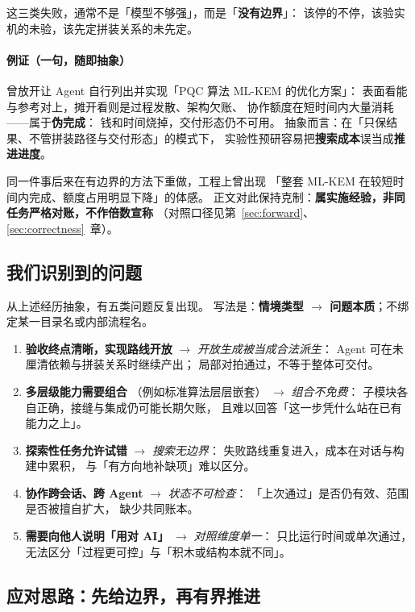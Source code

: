 \documentclass[UTF8,a4paper,11pt]{ctexart}
\theoremstyle{definition}
\theoremstyle{plain}
\theoremstyle{remark}
\numberwithin{figure}{section}
\numberwithin{table}{section}
\begin{document}
这三类失败，通常不是「模型不够强」，而是「\textbf{没有边界}」：
该停的不停，该验实机的未验，该先定拼装关系的未先定。

\paragraph{例证（一句，随即抽象）}
曾放开让 Agent 自行列出并实现「PQC 算法 ML-KEM 的优化方案」：
表面看能与参考对上，摊开看则是过程发散、架构欠账、
协作额度在短时间内大量消耗——属于\textbf{伪完成}：
钱和时间烧掉，交付形态仍不可用。
抽象而言：在「只保结果、不管拼装路径与交付形态」的模式下，
实验性预研容易把\textbf{搜索成本}误当成\textbf{推进进度}。

同一件事后来在有边界的方法下重做，工程上曾出现
「整套 ML-KEM 在较短时间内完成、额度占用明显下降」的体感。
正文对此保持克制：\textbf{属实施经验，非同任务严格对账，不作倍数宣称}
（对照口径见第~\ref{sec:forward}、\ref{sec:correctness}~章）。

\subsection{我们识别到的问题}

从上述经历抽象，有五类问题反复出现。
写法是：\textbf{情境类型 $\to$ 问题本质}；不绑定某一目录名或内部流程名。

\begin{enumerate}
  \item \textbf{验收终点清晰，实现路线开放}
        $\to$ \emph{开放生成被当成合法派生}：
        Agent 可在未厘清依赖与拼装关系时继续产出；
        局部对拍通过，不等于整体可交付。
  \item \textbf{多层级能力需要组合}
        （例如标准算法层层嵌套）
        $\to$ \emph{组合不免费}：
        子模块各自正确，接缝与集成仍可能长期欠账，
        且难以回答「这一步凭什么站在已有能力之上」。
  \item \textbf{探索性任务允许试错}
        $\to$ \emph{搜索无边界}：
        失败路线重复进入，成本在对话与构建中累积，
        与「有方向地补缺项」难以区分。
  \item \textbf{协作跨会话、跨 Agent}
        $\to$ \emph{状态不可检查}：
        「上次通过」是否仍有效、范围是否被擅自扩大，
        缺少共同账本。
  \item \textbf{需要向他人说明「用对 AI」}
        $\to$ \emph{对照维度单一}：
        只比运行时间或单次通过，
        无法区分「过程更可控」与「积木或结构本就不同」。
\end{enumerate}

\subsection{应对思路：先给边界，再有界推进}
\end{document}
